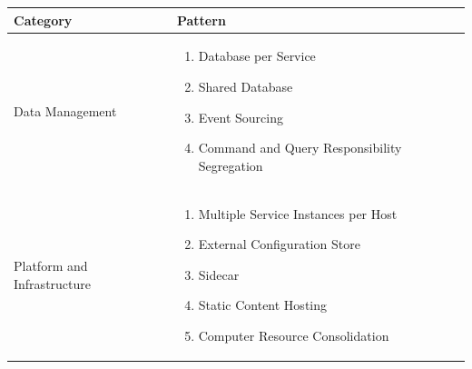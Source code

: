 \documentclass{bmcart}
\begin{document}
\begin{center}
  \begin{table}[h]
  \renewcommand*{\arraystretch}{1.8}
  \begin{tabular}{ | m{3cm} | m{8cm} | }

      \hline

      Category & Pattern

      \\

      \hline

      Data Management &  
 
      
      \begin{enumerate}
          \item Database per Service
          \item Shared Database
          \item Event Sourcing
          \item Command and Query Responsibility Segregation
      \end{enumerate} 

      \\

      \hline

      Platform and Infrastructure & 

 
      \begin{enumerate}
          \item Multiple Service Instances per Host
          \item External Configuration Store
          \item Sidecar
          \item Static Content Hosting
          \item Computer Resource Consolidation
      \end{enumerate} 
  

      \\

      \hline


\end{tabular}
\end{table}
\end{center}
\end{document}
